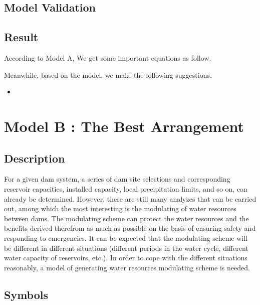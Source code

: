 \documentclass{mcmthesis}
\begin{document}
\subsection{Model Validation}

\subsection{Result}
\indent \indent According to Model A, We get some important equations as follow.

Meanwhile, based on the model, we make the following suggestions.
\begin{itemize}
  \item 
\end{itemize}









\section{Model B : The Best Arrangement}
\subsection{Description}
\indent For a given dam system, a series of dam site selections and corresponding reservoir capacities, installed capacity, local precipitation limits, and so on, can already be determined. However, there are still many analyzes that can be carried out, among which the most interesting is the modulating of water resources between dams. The modulating scheme can protect the water resources and the benefits derived therefrom as much as possible on the basis of ensuring safety and responding to emergencies. It can be expected that the modulating scheme will be different in different situations (different periods in the water cycle, different water capacity of reservoirs, etc.). In order to cope with the different situations reasonably, a model of generating water resources modulating scheme is needed.\\

\subsection{Symbols}
\end{document}

